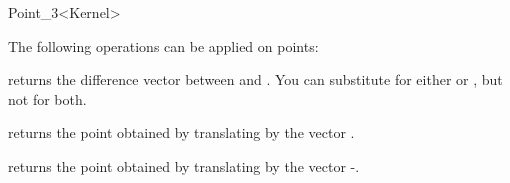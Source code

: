\begin{ccRefClass} {Point_3<Kernel>}

The following operations can be applied on points:

       {returns the difference vector between  and . 
        You can substitute  for either  or , 
        but not for both.}

       {returns the point obtained by translating  by the 
        vector .}

       {returns the point obtained by translating  by the 
        vector -.}

\ccSeeAlso


\end{ccRefClass} 

